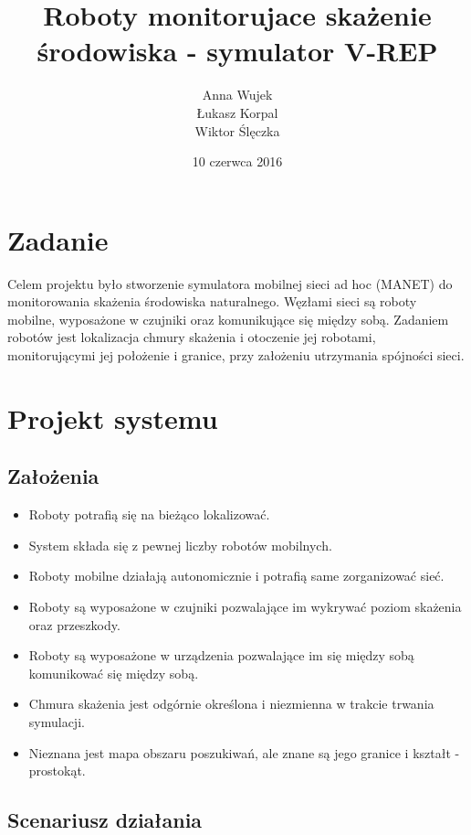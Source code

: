 \documentclass[a4paper, 12pt]{article}
\author{Anna Wujek \\ Łukasz Korpal \\ Wiktor Ślęczka}
\title{Roboty monitorujace skażenie środowiska - symulator V-REP}
\date{10 czerwca 2016}
\begin{document}
	\sloppy
	\maketitle
	\newpage
	\tableofcontents
	\newpage
	\section{Zadanie}
	Celem projektu było stworzenie symulatora mobilnej sieci ad hoc (MANET) do monitorowania skażenia środowiska naturalnego. Węzłami sieci są roboty mobilne, wyposażone w czujniki oraz komunikujące się między sobą. Zadaniem robotów jest lokalizacja chmury skażenia i otoczenie jej robotami, monitorującymi jej położenie i granice, przy założeniu utrzymania spójności sieci.
	
	
	\section{Projekt systemu}
	\subsection{Założenia}
	\begin{itemize}
		\item Roboty potrafią się na bieżąco lokalizować.
		\item System składa się z pewnej liczby robotów mobilnych.
		\item Roboty mobilne działają autonomicznie i potrafią same zorganizować sieć.
		\item Roboty są wyposażone w czujniki pozwalające im wykrywać poziom skażenia oraz przeszkody.
		\item Roboty są wyposażone w urządzenia pozwalające im się między sobą komunikować się między sobą.
		\item Chmura skażenia jest odgórnie określona i niezmienna w trakcie trwania symulacji.
		\item Nieznana jest mapa obszaru poszukiwań, ale znane są jego granice i kształt - prostokąt.
	\end{itemize}
	
	\subsection{Scenariusz działania}	
		
\end{document}
